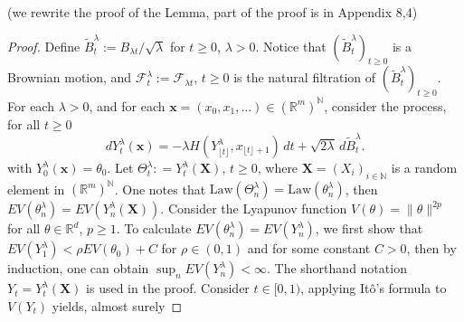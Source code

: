 \documentclass[a4paper]{article}
\begin{document}
\color{red}(we rewrite the proof of the Lemma, part of the proof is in Appendix 8,4) \color{black}
\begin{proof}

Define $\tilde{B}^{\lambda}_t := B_{\lambda t}/\sqrt{\lambda}$ for $t\geq 0$, $\lambda >0$. Notice that $(\tilde{B}^{\lambda}_t)_{t\geq 0}$ is a Brownian motion, and $\mathcal{F}^{\lambda}_t := \mathcal{F}_{\lambda t}$, $t\geq 0$ is the natural filtration of $(\tilde{B}^{\lambda}_t)_{t\geq 0}$. For each $\lambda >0$, and for each $\mathbf{x} = (x_0, x_1, \dots) \in (\mathbb{R}^m)^{\mathbb{N}}$, consider the process, for all $t \geq 0$
\[
dY^{\lambda}_t(\mathbf{x}) = -\lambda H(Y^{\lambda}_{\lfloor t \rfloor}, x_{\lfloor t \rfloor +1})\, dt + \sqrt{2\lambda}\, d\tilde{B}^{\lambda}_t.
\]
with $Y^{\lambda}_0(\mathbf{x}) = \theta _0$. Let $\Theta^{\lambda}_t : = Y^{\lambda}_t(\mathbf{X})$, $t \geq 0$, where $\mathbf{X} = (X_i)_{i \in \mathbb{N}}$ is a random element in $(\mathbb{R}^m)^{\mathbb{N}}$. One notes that $\mathrm{Law}(\Theta^{\lambda}_n) = \mathrm{Law}(\theta^{\lambda}_n)$, then $EV(\theta^{\lambda}_n) = EV(Y^{\lambda}_n(\mathbf{X}))$. Consider the Lyapunov function $V(\theta) = \|\theta\|^{2p}$ for all $\theta \in \mathbb{R}^d$, $p \geq 1$. %
To calculate $EV(\theta^{\lambda}_n) = EV(Y^{\lambda}_n)$, we first show that $EV(Y^{\lambda}_1) <\rho EV(\theta_0)  +C$ for $\rho \in (0,1)$ and for some constant $C>0$, then by induction, one can obtain $\sup_nEV(Y^{\lambda}_n) < \infty$. The shorthand notation $Y_t = Y^{\lambda}_t(\mathbf{X}) $ is used in the proof. Consider $t \in [0,1)$, applying It\^o's formula to $V(Y_t)$ yields, almost surely

\end{proof}
\end{document}
